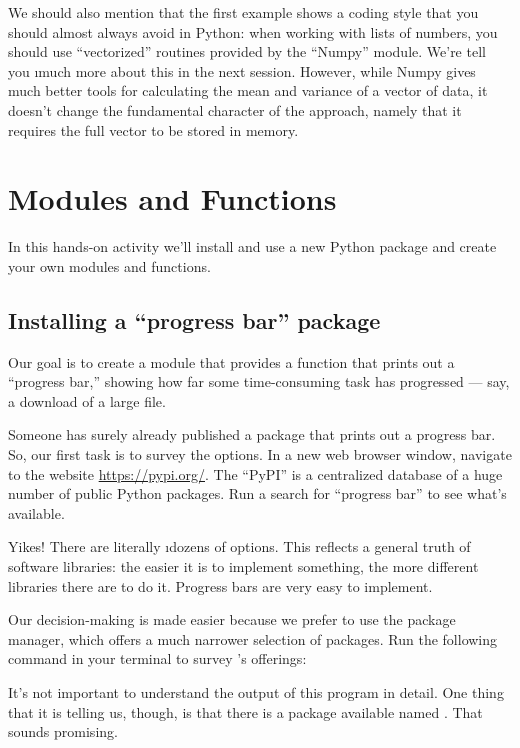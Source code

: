 \documentclass[letterpaper, 12pt, titlepage, twoside]{article}
\begin{document}
We should also mention that the first example shows a coding style that you
should almost always avoid in Python: when working with lists of numbers, you
should use ``vectorized'' routines provided by the ``Numpy'' module. We're
tell you \i{much} more about this in the next session. However, while Numpy
gives much better tools for calculating the mean and variance of a vector of
data, it doesn't change the fundamental character of the approach, namely that
it requires the full vector to be stored in memory.


\newpage
\section{Modules and Functions}

In this hands-on activity we'll install and use a new Python package and
create your own modules and functions.

\subsection*{Installing a ``progress bar'' package}

Our goal is to create a module that provides a function that prints out a
``progress bar,'' showing how far some time-consuming task has progressed ---
say, a download of a large file.

Someone has surely already published a package that prints out a progress bar.
So, our first task is to survey the options. In a new web browser window,
navigate to the website \url{https://pypi.org/}. The ``PyPI'' is a centralized
database of a huge number of public Python packages. Run a search for
``progress bar'' to see what's available.

Yikes! There are literally \i{dozens} of options. This reflects a general
truth of software libraries: the easier it is to implement something, the more
different libraries there are to do it. Progress bars are very easy to
implement.

Our decision-making is made easier because we prefer to use the 
package manager, which offers a much narrower selection of packages. Run the
following command in your terminal to survey 's offerings:


It's not important to understand the output of this program in detail. One
thing that it is telling us, though, is that there is a package available
named . That sounds promising.
\end{document}
